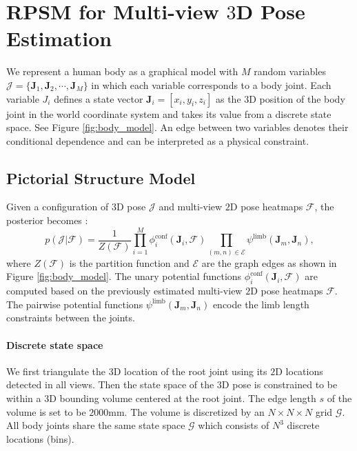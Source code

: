 \documentclass[10pt,twocolumn,letterpaper]{article}
\begin{document}
\section{RPSM for Multi-view $3$D Pose Estimation}
We represent a human body as a graphical model with $M$ random variables $\mathcal{J}=\{\bm{J}_1,
\bm{J}_2,\cdots,\bm{J}_M\}$ in which each variable corresponds to a body joint. Each variable $J_i$ defines a state vector $\bm{J}_i=[x_i, y_i, z_i]$ as the $3$D position of the body joint in the world coordinate system and takes its value from a discrete state space. See Figure \ref{fig:body_model}. An edge between two variables denotes their conditional dependence  and can be interpreted as a physical constraint. 



\subsection{Pictorial Structure Model}
Given a configuration of $3$D pose $\mathcal{J}$ and multi-view $2$D pose heatmaps $\mathcal{F}$, the posterior becomes \cite{belagiannis20143D}:
\begin{equation}
    p(\mathcal{J} | \mathcal{F})= \frac{1}{Z(\mathcal{F})} \prod_{i=1}^M{\phi_i^{\text{conf}}(\bm{J}_i, \mathcal{F})}\prod_{(m, n) \in \mathcal{E}}{\psi^{\text{limb}}(\bm{J}_m, \bm{J}_n)},
    \label{eq:psm}
\end{equation}
where $Z(\mathcal{F})$ is the partition function and $\mathcal{E}$ are the graph edges as shown in Figure \ref{fig:body_model}. The unary potential functions $\phi_i^{\text{conf}}(\bm{J}_i, \mathcal{F})$ are computed based on the previously estimated multi-view $2$D pose heatmaps $\mathcal{F}$. The pairwise potential functions $\psi^{\text{limb}}(\bm{J}_m, \bm{J}_n)$ encode the limb length constraints between the joints.


\paragraph{Discrete state space} We first triangulate the $3$D location of the root joint using its $2$D locations detected in all views. Then the state space of the $3$D pose is constrained to be within a $3$D bounding volume centered at the root joint. The edge length $s$ of the volume is set to be $2000$mm. The volume is discretized by an $N \times N \times N$ grid $\mathcal{G}$. All body joints share the same state space $\mathcal{G}$ which consists of $N^3$ discrete locations (bins).
\end{document}
